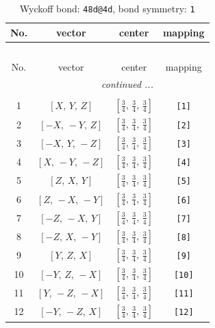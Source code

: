 \documentclass[fleqn,8pt]{jsarticle}
\begin{document}
\begin{longtable}{cccc}
\caption{Wyckoff bond: {\tt 48d@4d}, bond symmetry: {\tt 1}}
 \\
 \hline \hline
No. & vector & center & mapping \\ \hline \endfirsthead

\multicolumn{3}{l}{\tablename\ \thetable{}} \\
 \hline \hline
No. & vector & center & mapping \\ \hline \endhead

 \hline \hline
\multicolumn{3}{r}{\footnotesize\it continued ...} \\ \endfoot

 \hline \hline
\multicolumn{3}{r}{} \\ \endlastfoot

1 & $\left[ X,\, Y,\, Z \right]$ & $\left[ \frac{3}{4},\, \frac{3}{4},\, \frac{3}{4} \right]$ & {\tt [1]} \\ \hline
2 & $\left[ - X,\, - Y,\, Z \right]$ & $\left[ \frac{3}{4},\, \frac{3}{4},\, \frac{3}{4} \right]$ & {\tt [2]} \\ \hline
3 & $\left[ - X,\, Y,\, - Z \right]$ & $\left[ \frac{3}{4},\, \frac{3}{4},\, \frac{3}{4} \right]$ & {\tt [3]} \\ \hline
4 & $\left[ X,\, - Y,\, - Z \right]$ & $\left[ \frac{3}{4},\, \frac{3}{4},\, \frac{3}{4} \right]$ & {\tt [4]} \\ \hline
5 & $\left[ Z,\, X,\, Y \right]$ & $\left[ \frac{3}{4},\, \frac{3}{4},\, \frac{3}{4} \right]$ & {\tt [5]} \\ \hline
6 & $\left[ Z,\, - X,\, - Y \right]$ & $\left[ \frac{3}{4},\, \frac{3}{4},\, \frac{3}{4} \right]$ & {\tt [6]} \\ \hline
7 & $\left[ - Z,\, - X,\, Y \right]$ & $\left[ \frac{3}{4},\, \frac{3}{4},\, \frac{3}{4} \right]$ & {\tt [7]} \\ \hline
8 & $\left[ - Z,\, X,\, - Y \right]$ & $\left[ \frac{3}{4},\, \frac{3}{4},\, \frac{3}{4} \right]$ & {\tt [8]} \\ \hline
9 & $\left[ Y,\, Z,\, X \right]$ & $\left[ \frac{3}{4},\, \frac{3}{4},\, \frac{3}{4} \right]$ & {\tt [9]} \\ \hline
10 & $\left[ - Y,\, Z,\, - X \right]$ & $\left[ \frac{3}{4},\, \frac{3}{4},\, \frac{3}{4} \right]$ & {\tt [10]} \\ \hline
11 & $\left[ Y,\, - Z,\, - X \right]$ & $\left[ \frac{3}{4},\, \frac{3}{4},\, \frac{3}{4} \right]$ & {\tt [11]} \\ \hline
12 & $\left[ - Y,\, - Z,\, X \right]$ & $\left[ \frac{3}{4},\, \frac{3}{4},\, \frac{3}{4} \right]$ & {\tt [12]} \\
\end{longtable}
\end{document}
